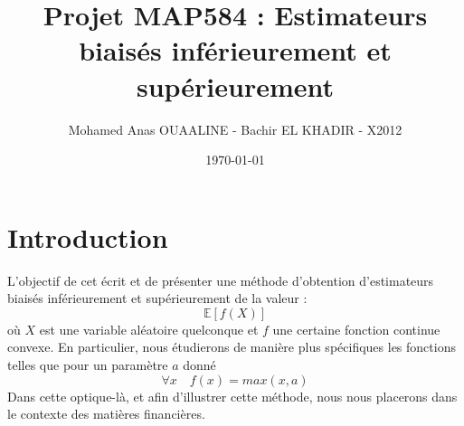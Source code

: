 \documentclass[12pt,french]{article}
\title{Projet MAP584 : Estimateurs biaisés inférieurement et supérieurement }
\author{Mohamed Anas OUAALINE - Bachir EL KHADIR - X2012}
\date \today
\begin{document}
\maketitle


\newpage

\tableofcontents

\newpage

\section{Introduction}
L'objectif de cet écrit et de présenter une méthode d'obtention d'estimateurs biaisés inférieurement et supérieurement de la valeur : 
$$ \mathbb{E} [f(X)] $$
où $X$ est une variable aléatoire quelconque et $f$ une certaine fonction continue convexe. En particulier, nous étudierons de manière plus spécifiques les fonctions telles que pour un paramètre $a$ donné $$ \forall x \quad f(x) = max(x,a) $$ 
Dans cette optique-là, et afin d'illustrer cette méthode, nous nous placerons dans le contexte des matières financières.
\end{document}
